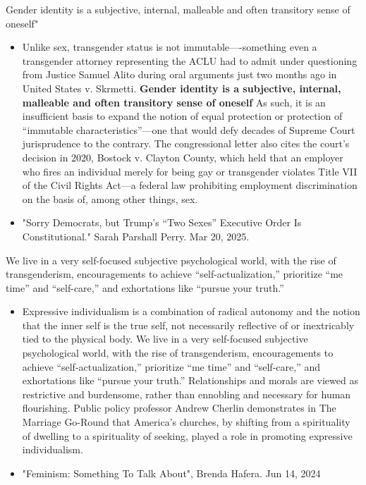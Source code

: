 \documentclass[11pt]{article}
\author{fcalado}
\date{\today}
\title{}
\begin{document}
\tableofcontents

Gender identity is a subjective, internal, malleable and often
transitory sense of oneself"
\begin{itemize}
\item Unlike sex, transgender status is not immutable—-something even a
transgender attorney representing the ACLU had to admit under
questioning from Justice Samuel Alito during oral arguments just two
months ago in United States v. Skrmetti. \textbf{\textbf{Gender identity is a
subjective, internal, malleable and often transitory sense of
oneself}} As such, it is an insufficient basis to expand the notion
of equal protection or protection of “immutable characteristics”—one
that would defy decades of Supreme Court jurisprudence to the
contrary. The congressional letter also cites the court’s decision
in 2020, Bostock v. Clayton County, which held that an employer who
fires an individual merely for being gay or transgender violates
Title VII of the Civil Rights Act---a federal law prohibiting
employment discrimination on the basis of, among other things, sex.
\item "Sorry Democrats, but Trump’s “Two Sexes” Executive Order Is
Constitutional." Sarah Parshall Perry. Mar 20, 2025.
\end{itemize}


We live in a very self-focused subjective psychological world, with
the rise of transgenderism, encouragements to achieve
“self-actualization,” prioritize “me time” and “self-care,” and
exhortations like “pursue your truth.”
\begin{itemize}
\item Expressive individualism is a combination of radical autonomy and
the notion that the inner self is the true self, not necessarily
reflective of or inextricably tied to the physical body. We live in
a very self-focused subjective psychological world, with the rise of
transgenderism, encouragements to achieve “self-actualization,”
prioritize “me time” and “self-care,” and exhortations like “pursue
your truth.” Relationships and morals are viewed as restrictive and
burdensome, rather than ennobling and necessary for human
flourishing. Public policy professor Andrew Cherlin demonstrates
in The Marriage Go-Round that America’s churches, by shifting from a
spirituality of dwelling to a spirituality of seeking, played a role
in promoting expressive individualism.
\item "Feminism: Something To Talk About", Brenda Hafera. Jun 14, 2024
\end{itemize}
\end{document}

